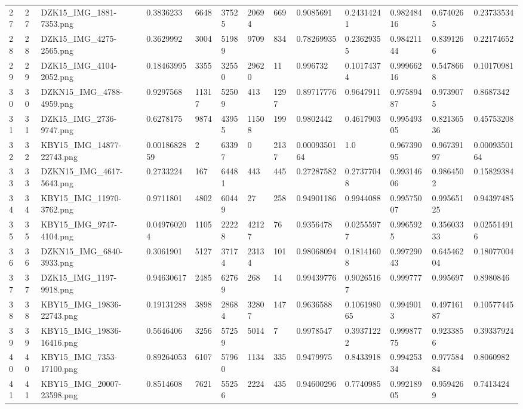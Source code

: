 \documentclass[11pt, a4paper, twoside]{report}
\begin{document}
\begin{longtable}[c]{@{}lllllllllllll@{}}
27 & 27 & DZK15\_IMG\_1881-7353.png & 0.3836233 & 6648 & 37525 & 20694 & 669 & 0.9085691 & 0.24314241 & 0.98248416 & 0.6740265 & 0.23733534 \\
28 & 28 & DZK15\_IMG\_4275-2565.png & 0.3629992 & 3004 & 51989 & 9709 & 834 & 0.78269935 & 0.23629355 & 0.98421144 & 0.8391266 & 0.22174652 \\
29 & 29 & DZK15\_IMG\_4104-2052.png & 0.18463995 & 3355 & 32550 & 29620 & 11 & 0.996732 & 0.10174374 & 0.99966216 & 0.5478668 & 0.10170981 \\
30 & 30 & DZKN15\_IMG\_4788-4959.png & 0.9297568 & 11317 & 52509 & 413 & 1297 & 0.89717776 & 0.9647911 & 0.97589487 & 0.9739075 & 0.8687342 \\
31 & 31 & DZK15\_IMG\_2736-9747.png & 0.6278175 & 9874 & 43955 & 11508 & 199 & 0.9802442 & 0.4617903 & 0.99549305 & 0.82136536 & 0.45753208 \\
32 & 32 & KBY15\_IMG\_14877-22743.png & 0.0018682859 & 2 & 63397 & 0 & 2137 & 0.0009350164 & 1.0 & 0.96739095 & 0.96739197 & 0.0009350164 \\
33 & 33 & DZKN15\_IMG\_4617-5643.png & 0.2733224 & 167 & 64481 & 443 & 445 & 0.27287582 & 0.27377048 & 0.99314606 & 0.9864502 & 0.15829384 \\
34 & 34 & KBY15\_IMG\_11970-3762.png & 0.9711801 & 4802 & 60449 & 27 & 258 & 0.94901186 & 0.9944088 & 0.99575007 & 0.99565125 & 0.94397485 \\
35 & 35 & KBY15\_IMG\_9747-4104.png & 0.049760204 & 1105 & 22228 & 42127 & 76 & 0.9356478 & 0.02555977 & 0.9965925 & 0.35603333 & 0.025514916 \\
36 & 36 & DZKN15\_IMG\_6840-3933.png & 0.3061901 & 5127 & 37174 & 23134 & 101 & 0.98068094 & 0.18141608 & 0.99729043 & 0.64546204 & 0.18077004 \\
37 & 37 & DZK15\_IMG\_1197-9918.png & 0.94630617 & 2485 & 62769 & 268 & 14 & 0.99439776 & 0.90265167 & 0.999777 & 0.995697 & 0.8980846 \\
38 & 38 & KBY15\_IMG\_19836-22743.png & 0.19131288 & 3898 & 28684 & 32807 & 147 & 0.9636588 & 0.106198065 & 0.9949013 & 0.49716187 & 0.10577445 \\
39 & 39 & KBY15\_IMG\_19836-16416.png & 0.5646406 & 3256 & 57259 & 5014 & 7 & 0.9978547 & 0.39371222 & 0.99987775 & 0.9233856 & 0.39337924 \\
40 & 40 & KBY15\_IMG\_7353-17100.png & 0.89264053 & 6107 & 57960 & 1134 & 335 & 0.9479975 & 0.8433918 & 0.99425334 & 0.97758484 & 0.8060982 \\
41 & 41 & KBY15\_IMG\_20007-23598.png & 0.8514608 & 7621 & 55256 & 2224 & 435 & 0.94600296 & 0.7740985 & 0.99218905 & 0.9594269 & 0.7413424 \\

\end{longtable}
\end{document}
